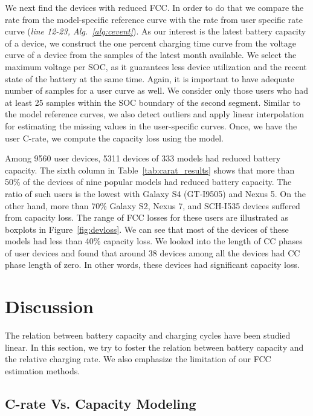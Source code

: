 \documentclass[journal]{IEEEtran}
\begin{document}
We next find the devices with reduced FCC. In order to do that we compare the rate from the model-specific reference curve with the rate from user specific rate curve (\textit{line 12-23, Alg.~\ref{alg:cevent}}). As our interest is the latest battery capacity of a device, we construct the one percent charging time curve from the voltage curve of a device from the samples of the latest month available.  We select the maximum voltage per SOC, as it guarantees less device utilization and the recent state of the battery at the same time. Again, it is important to have adequate number of samples for a user curve as well. We consider only those users who had  at least 25 samples within the SOC boundary of the second segment. Similar to the model reference curves, we also detect outliers and apply linear interpolation for estimating the missing values in the user-specific curves. Once, we have the user C-rate, we compute the capacity loss using the model.


Among 9560 user devices, 5311 devices of 333 models had reduced battery capacity. The sixth column in Table~\ref{tab:carat_results} shows that more than 50\% of the devices of nine popular models had reduced battery capacity. The ratio of such users is the  lowest with Galaxy S4 (GT-I9505) and Nexus 5. On the other hand, more than 70\% Galaxy S2, Nexus 7, and SCH-I535 devices suffered from capacity loss. The range of FCC losses for these users are illustrated as boxplots in Figure~\ref{fig:devloss}. We can see that most of the devices of these models had less than 40\% capacity loss. We looked into the length of CC phases of user devices and found that around 38 devices among all the devices had CC phase length of zero. In other words, these devices had significant capacity loss.






\section{Discussion}
\label{sec:seven}

The relation between battery capacity and charging cycles have been studied linear. In this section, we try to foster the relation between battery capacity and the relative charging rate. We also emphasize the limitation of our FCC estimation methods.
\subsection{C-rate Vs. Capacity Modeling}
\end{document}
